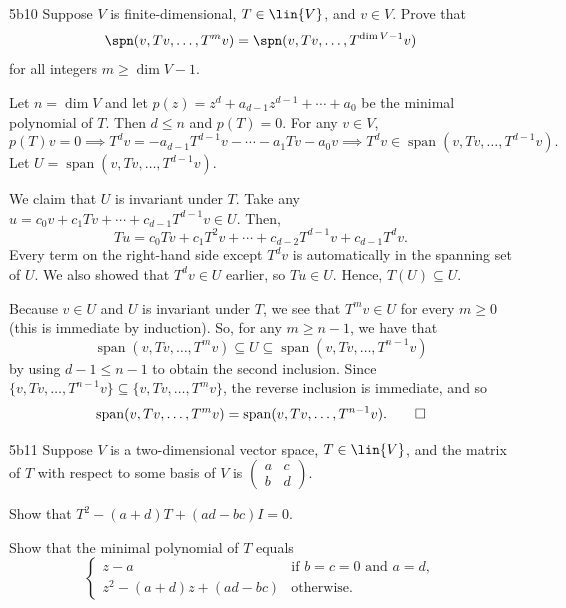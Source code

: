 \begin{exercise}{5b10}
    Suppose $V$ is finite-dimensional, $T \in \lin{V}$, and $v \in V$.
	Prove that
    \[
    	\spn(v, Tv, \ldots, T^m v) = \spn(v, Tv, \ldots, T^{\dim V - 1} v)
    \]
    for all integers $m \geq \dim V - 1$.
\end{exercise}

\begin{sol}
    Let $n=\dim V$ and let $p(z)=z^d+a_{d-1}z^{d-1}+\cdots+a_0$ be the minimal polynomial of $T$.
	Then $d \leq n$ and $p(T)=0$.
	For any $v \in V$,
    \[
    	p(T)v=0 \implies T^d v=-a_{d-1} T^{d-1} v-\cdots-a_1 Tv-a_0 v \implies T^d v \in \operatorname{span}\left(v, Tv, \dots, T^{d-1} v \right).
    \]
    Let $U=\operatorname{span}\left(v, Tv, \dots, T^{d-1} v\right)$.

    We claim that $U$ is invariant under $T$.
	Take any $u=c_0 v+c_1 Tv+\cdots+c_{d-1} T^{d-1} v \in U$.
	Then,
    \[
    	Tu=c_0 Tv+c_1 T^2 v+\cdots+c_{d-2} T^{d-1} v+c_{d-1} T^d v.
    \]
    Every term on the right-hand side except $T^d v$ is automatically in the spanning set of $U$.
	We also showed that $T^d v \in U$ earlier, so $Tu \in U$.
	Hence, $T(U) \subseteq U$.

    Because $v \in U$ and $U$ is invariant under $T$, we see that $T^m v \in U$ for every $m \geq 0$ (this is immediate by induction).
	So, for any $m \geq n-1$, we have that
    \[
    	\operatorname{span}(v, Tv, \dots, T^m v) \subseteq U \subseteq \operatorname{span}(v, Tv, \dots, T^{n-1}v)
    \]
    by using $d-1 \leq n-1$ to obtain the second inclusion.
	Since $\{v, Tv, \dots, T^{n-1} v\} \subseteq \{v, Tv, \dots, T^m v\}$, the reverse inclusion is immediate, and so
    \[
    	\operatorname{span}(v, Tv, \dots, T^m v)=\operatorname{span}(v, Tv, \dots, T^{n-1}v). \qedhere
    \]
\end{sol}

\begin{exercise}{5b11}
    Suppose $V$ is a two-dimensional vector space, $T \in \lin{V}$, and the matrix of $T$ with respect to some basis of $V$ is $\begin{pmatrix} a & c \\ b & d \end{pmatrix}$.
    \begin{subexercises}
        \item Show that $T^2 - (a + d)T + (ad - bc)I = 0$.
        \item Show that the minimal polynomial of $T$ equals
        \[
            \begin{cases}
                z - a & \text{if } b = c = 0 \text{ and } a = d, \\
                z^2 - (a + d)z + (ad - bc) & \text{otherwise.}
            \end{cases}
        \]
    \end{subexercises}
\end{exercise}

